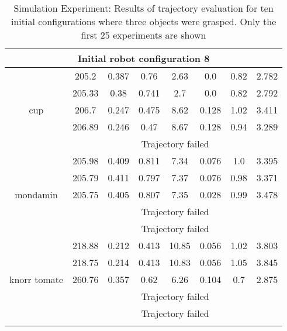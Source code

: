 {\begin{center}
\begin{longtable}[c]{ | c | c | c | c | c | c | c || c || }
\hline 
\multicolumn{8}{|c|}{Initial robot configuration 8} \\\hline
\multirow{5}{1.5cm}{cup}& 205.2 & 0.387 & 0.76 & 2.63 & 0.0 & 0.82 & 2.782 \\
& 205.33 & 0.38 & 0.741 & 2.7 & 0.0 & 0.82 & 2.792 \\
& 206.7 & 0.247 & 0.475 & 8.62 & 0.128 & 1.02 & 3.411 \\
& 206.89 & 0.246 & 0.47 & 8.67 & 0.128 & 0.94 & 3.289 \\
& \multicolumn{7}{c|}{Trajectory failed} \\
\hline 
\multirow{5}{1.5cm}{mondamin}& 205.98 & 0.409 & 0.811 & 7.34 & 0.076 & 1.0 & 3.395 \\
& 205.79 & 0.411 & 0.797 & 7.37 & 0.076 & 0.98 & 3.371 \\
& 205.75 & 0.405 & 0.807 & 7.35 & 0.028 & 0.99 & 3.478 \\
& \multicolumn{7}{c|}{Trajectory failed} \\
& \multicolumn{7}{c|}{Trajectory failed} \\
\hline 
\multirow{5}{1.5cm}{knorr tomate}& 218.88 & 0.212 & 0.413 & 10.85 & 0.056 & 1.02 & 3.803 \\
& 218.75 & 0.214 & 0.413 & 10.83 & 0.056 & 1.05 & 3.845 \\
& 260.76 & 0.357 & 0.62 & 6.26 & 0.104 & 0.7 & 2.875 \\
& \multicolumn{7}{c|}{Trajectory failed} \\
& \multicolumn{7}{c|}{Trajectory failed} \\
\hline 

\caption{Simulation Experiment: Results of trajectory evaluation for ten initial configurations where three objects were grasped. Only the first 25 experiments are shown}
\label{table:sim} 
\end{longtable}
\end{center}
}
